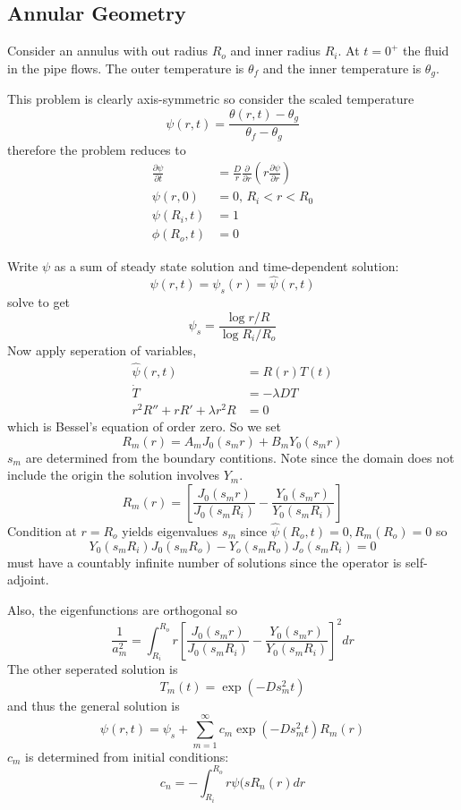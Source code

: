 \documentclass[a4paper]{article}
\begin{document}
\subsection{Annular Geometry}

Consider an annulus with out radius \(R_o\) and inner radius \(R_i\). At \(t = 0^+\) the fluid in the pipe flows. The outer temperature is \(\theta_f\) and the inner temperature is \(\theta_g\).

This problem is clearly axis-symmetric so consider the scaled temperature
\[
  \psi(r, t) = \frac{\theta(r, t) - \theta_g}{\theta_f - \theta_g}
\]
therefore the problem reduces to
\begin{align*}
  \frac{\partial \psi}{\partial t} &= \frac{D}{r} \frac{\partial  }{\partial r} \left( r \frac{\partial \psi}{\partial r} \right) \\
  \psi(r, 0) &= 0, \, R_i < r < R_0 \\
  \psi(R_i, t) &= 1 \\
  \phi(R_o, t) &= 0
\end{align*}

Write \(\psi\) as a sum of steady state solution and time-dependent solution:
\[
  \psi(r, t) = \psi_s(r) = \hat \psi(r, t)
\]
solve to get
\[
  \psi_s = \frac{\log r/R}{\log R_i/R_o}
\]
Now apply seperation of variables,
\begin{align*}
  \hat \psi(r, t) &= R(r)T(t) \\
  \dot T &= -\lambda D T \\
  r^2 R'' + r R' + \lambda r^2 R &= 0
\end{align*}
which is Bessel's equation of order zero. So we set
\[
  R_m(r) = A_m J_0(s_m r) + B_m Y_0(s_m r)
\]
\(s_m\) are determined from the boundary contitions. Note since the domain does not include the origin the solution involves \(Y_m\).
\[
  R_m(r) = \left[ \frac{J_0(s_m r)}{J_0(s_m R_i)} - \frac{Y_0(s_m r)}{Y_0(s_m R_i)} \right]
\]
Condition at \(r = R_o\) yields eigenvalues \(s_m\) since \(\hat \psi(R_o, t) = 0, R_m(R_o) = 0\) so
\[
  Y_0(s_m R_i) J_0(s_m R_o) - Y_o(s_m R_o)J_o(s_m R_i) = 0
\]
must have a countably infinite number of solutions since the operator is self-adjoint.

Also, the eigenfunctions are orthogonal so
\[
  \frac{1}{a_m^2} = \int_{R_i}^{R_o} r \left[ \frac{J_0(s_m r)}{J_0(s_m R_i)} - \frac{Y_0(s_m r)}{Y_0(s_m R_i)} \right]^2 dr
\]
The other seperated solution is
\[
  T_m(t) = \exp \left( -D s_m^2 t \right)
\]
and thus the general solution is
\[
  \psi(r, t) = \psi_s + \sum_{m=1}^{\infty} c_m \exp \left( -D s_m^2 t \right) R_m(r)
\]
\(c_m\) is determined from initial conditions:
\[
  c_n = - \int_{R_i}^{R_o} r \psi(s R_n(r) dr
\]
\end{document}
